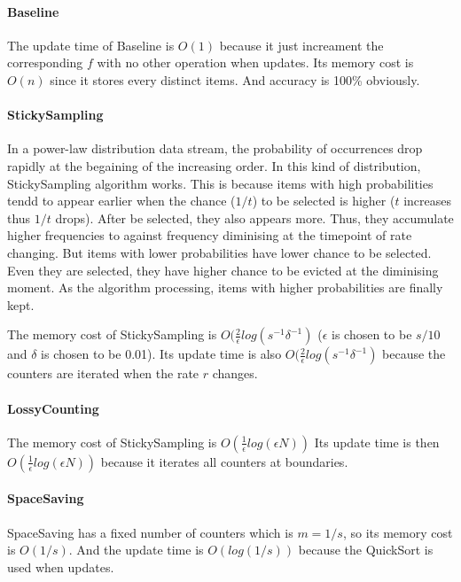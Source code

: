 \documentclass[10pt]{article}
\begin{document}
\paragraph{Baseline}
The update time of Baseline is $O(1)$ because it just increament the corresponding $f$ with no other operation when updates.
Its memory cost is $O(n)$ since it stores every distinct items. And accuracy is 100\% obviously.
\paragraph{StickySampling}
In a power-law distribution data stream, the probability of occurrences drop rapidly at the begaining 
of the increasing order. In this kind of distribution, StickySampling algorithm works. 
This is because items with high probabilities tendd to appear earlier when the chance ($1/t$) to be selected is higher ($t$ increases thus $1/t$ drops).
After be selected, they also appears more. Thus, they accumulate higher frequencies to against frequency diminising at the timepoint of rate changing.
But items with lower probabilities have lower chance to be selected. 
Even they are selected, they have higher chance to be evicted at the diminising moment.
As the algorithm processing, items with higher probabilities are finally kept.

The memory cost of StickySampling is $O(\frac{2}{\epsilon}log(s^{-1}\delta^{-1})$ \cite{stickylossy}
($\epsilon{}$ is chosen to be $s/10$ and $\delta{}$ is chosen to be 0.01).
Its update time is also $O(\frac{2}{\epsilon}log(s^{-1}\delta^{-1})$ because the counters are iterated when the rate $r$ changes.
\paragraph{LossyCounting}
The memory cost of StickySampling is $O(\frac{1}{\epsilon}log(\epsilon{}N))$ 
Its update time is then $O(\frac{1}{\epsilon}log(\epsilon{}N))$ because it iterates all counters at boundaries.
\paragraph{SpaceSaving}
SpaceSaving has a fixed number of counters which is $m = 1/s$, so its memory cost is $O(1/s)$. 
And the update time is $O(log(1/s))$ because the QuickSort is used when updates.
\end{document}
